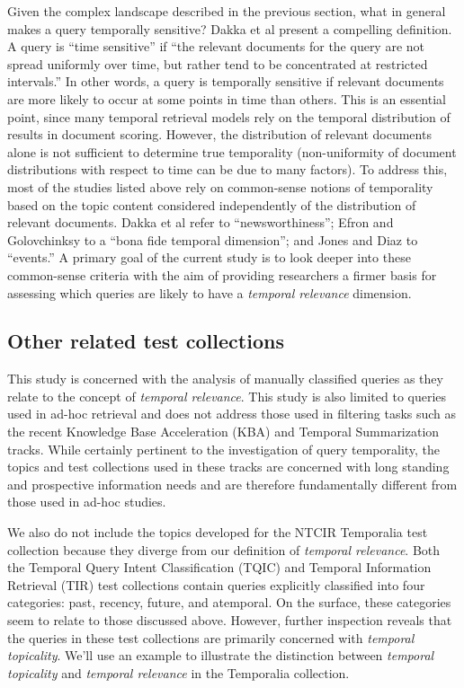 \documentclass{sig-alternate}
\begin{document}
Given the complex landscape described in the previous section, what in general makes a query temporally sensitive? Dakka et al \cite{Dakka2012} present a compelling definition. A query is ``time sensitive''  if  ``the relevant documents for the query are not spread uniformly over time, but rather tend to be concentrated at restricted intervals.''  In other words, a query is temporally sensitive if relevant documents are more likely to occur at some points in time than others. This is an essential point, since many temporal retrieval models rely on the temporal distribution of results in document scoring. However, the distribution of relevant documents alone is not sufficient to determine true temporality (non-uniformity of document distributions with respect to time can be due to many factors). To address this, most of the studies listed above rely on common-sense notions of temporality based on the topic content considered independently of the distribution of relevant documents. Dakka et al refer to ``newsworthiness''; Efron and Golovchinksy to a ``bona fide temporal dimension''; and Jones and Diaz to ``events.''  A primary goal of the current study is to look deeper into these common-sense criteria with the aim of providing researchers a firmer basis for assessing which queries are likely to have a \emph{temporal relevance} dimension.


\subsection{Other related test collections}

This study is concerned with the analysis of manually classified queries as they relate to the concept of \emph{temporal relevance}. This study is also limited to queries used in ad-hoc retrieval and does not address those used in filtering tasks such as the recent Knowledge Base Acceleration (KBA) \cite{Frank2013} and Temporal Summarization \cite{Guo2013} tracks.  While certainly pertinent to the investigation of query temporality, the topics and test collections used in these tracks are concerned with long standing and prospective information needs and are therefore fundamentally different from those used in ad-hoc studies. 

We also do not include the topics developed for the NTCIR Temporalia test collection \cite{Joho2014} because they diverge from our definition of \emph{temporal relevance}.  Both the Temporal Query Intent Classification (TQIC) and Temporal Information Retrieval (TIR) test collections contain queries explicitly classified into four categories: past, recency, future, and atemporal. On the surface, these categories seem to relate to those discussed above. However, further inspection reveals that the queries in these test collections are primarily concerned with \emph{temporal topicality}.  
We'll use an example to illustrate the distinction between \emph{temporal topicality} and \emph{temporal relevance} in the Temporalia collection. 
\end{document}
